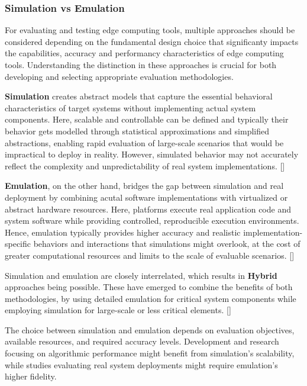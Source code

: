 \subsubsection{Simulation vs Emulation}
For evaluating and testing edge computing tools, multiple approaches should be considered depending on the fundamental design choice that significanty impacts the capabilities, accuracy and performancy characteristics of edge computing tools.
Understanding the distinction in these approaches is crucial for both developing and selecting appropriate evaluation methodologies.

\textbf{Simulation} creates abstract models that capture the essential behavioral characteristics of target systems without implementing actual system components.
Here, scalable and controllable can be defined and typically their behavior gets modelled through statistical approximations and simplified abstractions, enabling rapid evaluation of large-scale scenarios that would be impractical to deploy in reality.
However, simulated behavior may not accurately reflect the complexity and unpredictability of real system implementations. [\cite{inproceedings-sim-vs-emu}]

\textbf{Emulation}, on the other hand, bridges the gap between simulation and real deployment by combining acutal software implementations with virtualized or abstract hardware resources.
Here, platforms execute real application code and system software while providing controlled, reproducible execution environments.
Hence, emulation typically provides higher accuracy and realistic implementation-specific behaviors and interactions that simulations might overlook, at the cost of greater computational resources and limits to the scale of evaluable scenarios. [\cite{inproceedings-sim-vs-emu}]

Simulation and emulation are closely interrelated, which results in \textbf{Hybrid} approaches being possible.
These have emerged to combine the benefits of both methodologies, by using detailed emulation for critical system components while employing simulation for large-scale or less critical elements. [\cite{inproceedings-sim-vs-emu}]

The choice between simulation and emulation depends on evaluation objectives, available resources, and required accuracy levels.
Development and research focusing on algorithmic performance might benefit from simulation's scalability, while studies evaluating real system deployments might require emulation's higher fidelity.

